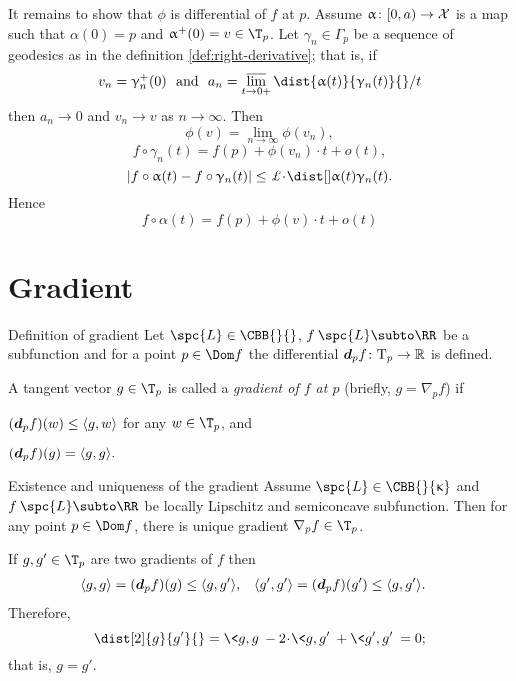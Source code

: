 It remains to show that $\phi$ is differential of $f$ at $p$.
Assume $\alpha\:[0,a)\to\spc{X}$ is a map such that $\alpha(0)=p$ and $\alpha^+(0)=v\in \T_p$.
Let $\gamma_n\in\Gamma_p$ be a sequence of geodesics as in the definition \ref{def:right-derivative};
that is, if 
\[v_n=\gamma^+_n(0)\ \ \t{and}\ \ a_n= \limsup_{t\to0+}{\dist{\alpha(t)}{\gamma_n(t)}{}}/{t}\] 
then $a_n\to 0$ and $v_n\to v$ as $n\to\infty$.
Then 
\[\phi(v)=\lim_{n\to\infty}\phi(v_n),\] \[f\circ\gamma_n(t)=f(p)+\phi(v_n)\cdot t+o(t),\] 
\[|f\circ\alpha(t)-f\circ\gamma_n(t)|\le\Lip\cdot\dist[{{}}]{\alpha(t)}{\gamma_n(t)}{}.\]
Hence 
\[f\circ\alpha(t)=f(p)+\phi(v)\cdot t+o(t)\]
\qedsf









\section{Gradient}\label{sec:grad-def}

\begin{thm}{Definition of gradient}\label{def:grad} 
Let $\spc{L}\in\CBB{}{}$, 
$f\:\spc{L}\subto\RR$ be a subfunction
and for a point
$p\in\Dom f$ the differential $\d_p f\:\T_p\to\RR$ is defined.

A tangent vector $g\in \T_p$ is called a 
\emph{gradient of $f$ at $p$} 
(briefly,  $g=\nabla_p f$\index{$\nabla$}) if
\begin{subthm}{}
$(\d_p f)(w)\le \<g,w\>$ for any $w\in \T_p$, and
\end{subthm}

\begin{subthm}{}
$(\bm{d}_p f)(g) = \langle g,g\rangle .$
\end{subthm}
\end{thm}

\begin{thm}{Existence and uniqueness of the gradient}\label{thm:ex-grad} 
Assume $\spc{L}\in\CBB{}{\kappa}$
and $f\:\spc{L}\subto\RR$ be 
locally Lipschitz 
and 
semiconcave subfunction.
Then for any point $p\in \Dom f$, there is unique gradient $\nabla_p f\in \T_p$.
\end{thm}

If $g,g'\in \T_p$ are two gradients of $f$
then 
\begin{align*}
\<g,g\>
&=(\d_p f)(g)\le \<g,g'\>,
&
\<g',g'\>
&=(\d_p f)(g')\le \<g,g'\>.
\end{align*}
Therefore,
\[\dist[2]{g}{g'}{}=\<g,g\>-2\cdot\<g,g'\>+\<g',g'\>=0;\] 
that is, $g=g'$.

